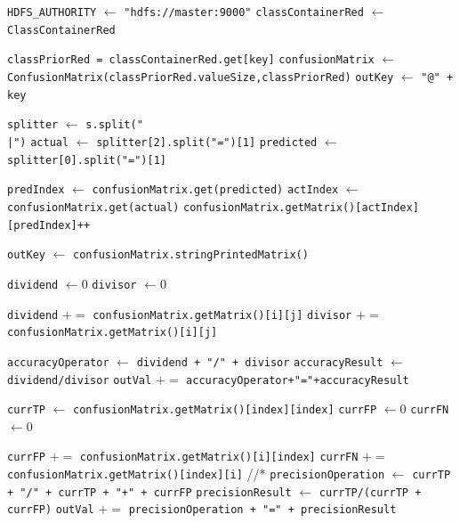 \begin{enumerate}
\begin{itemize}
\begin{enumerate}
\begin{algorithm}[H]
\begin{algorithmic}[1]
			\State \verb|HDFS_AUTHORITY| $\gets$ \texttt{"hdfs://master:9000"}
			\State \texttt{classContainerRed} $\gets$ \texttt{ClassContainerRed}

			\State \texttt{classPriorRed = classContainerRed.get[key]}
			\State \texttt{confusionMatrix} $\gets$ \texttt{ConfusionMatrix(classPriorRed.valueSize,classPriorRed)}
			\State \texttt{outKey} $\gets$ \texttt{"@" + key}
			
				\State \texttt{splitter} $\gets$ \texttt{s.split("\\|")}
				\State \texttt{actual} $\gets$ \texttt{splitter[2].split("=")[1]}
				\State \texttt{predicted} $\gets$ \texttt{splitter[0].split("=")[1]}
				
				\State \texttt{predIndex} $\gets$ \texttt{confusionMatrix.get(predicted)}
				\State \texttt{actIndex} $\gets$ \texttt{confusionMatrix.get(actual)}
				\State \texttt{confusionMatrix.getMatrix()[actIndex][predIndex]++}
			\EndFor 
        	
        	\State \texttt{outKey} $\gets$ \texttt{confusionMatrix.stringPrintedMatrix()}
			   	
        	\State \texttt{dividend} $\gets 0$ 
			\State \texttt{divisor}	$\gets 0$
			
						\State \texttt{dividend} $+=$ \texttt{confusionMatrix.getMatrix()[i][j]}
					\EndIf
					\State \texttt{divisor} $+=$ \texttt{confusionMatrix.getMatrix()[i][j]}
				\EndFor
			\EndFor
			
			\State \texttt{accuracyOperator} $\gets$ \texttt{dividend + "/" + divisor}
			\State \texttt{accuracyResult} $\gets$ \texttt{dividend/divisor}
			\State \texttt{outVal} $+=$ \texttt{accuracyOperator+"="+accuracyResult}
			

				\State \texttt{currTP} $\gets$ \texttt{confusionMatrix.getMatrix()[index][index]}
				\State \texttt{currFP} $\gets 0$
				\State \texttt{currFN} $\gets 0$
				
						\State \texttt{currFP} $+=$ \texttt{confusionMatrix.getMatrix()[i][index]}
						\State \texttt{currFN} $+=$ \texttt{confusionMatrix.getMatrix()[index][i]}
					\EndIf
				\EndFor
				//*
				\State \texttt{precisionOperation} $\gets$ \texttt{currTP + "/" + currTP + "+" + currFP}
				\State \texttt{precisionResult} $\gets$ \texttt{currTP/(currTP + currFP)}
				\State \texttt{outVal} $+=$ \texttt{precisionOperation + "=" + precisionResult}
				

\end{algorithmic}
\end{algorithm}
\end{enumerate}
\end{itemize}
\end{enumerate}
